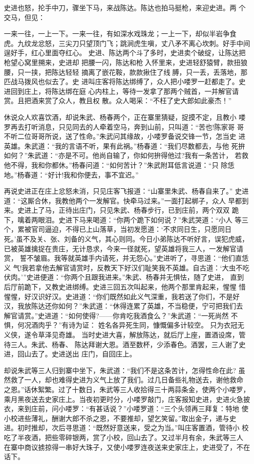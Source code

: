 史进也怒，抡手中刀，骤坐下马，来战陈达。陈达也拍马挺枪，来迎史进。两
个交马，但见：

一来一往，一上一下。一来一往，有如深水戏珠龙；一上一下，却似半岩争食
虎。九纹龙忿怒，三尖刀只望顶门飞；跳涧虎生嗔，丈八矛不离心坎刺。好手中间
逞好手，红心里面夺红心。
史进、陈达两个斗了多时，史进卖个破绽，让陈达把枪望心窝里搠来，史进却
把腰一闪，陈达和枪入怀里来，史进轻舒猿臂，款扭狼腰，只一挟，把陈达轻轻
摘离了嵌花鞍，款款揪住了线膊，只一丢，丢落地，那匹战马拨风也似去了。史
进叫庄客将陈达绑缚了，众人把小喽罗一赶都走了。史进回到庄上，将陈达绑在庭
心内柱上，等待一发拿了那两个贼首，一并解官请赏。且把酒来赏了众人，教且权
散。众人喝采：“不枉了史大郎如此豪杰！”

休说众人欢喜饮酒，却说朱武、杨春两个，正在寨里猜疑，捉摸不定，且教小
喽罗再去打听消息，只见同去的人牵着空马，奔到山前，只叫道：“苦也!陈家哥
哥不听二位哥哥所说，送了性命。”朱武问其缘故，小喽罗备说交锋一节，怎当史
进英雄。朱武道：“我的言语不听，果有此祸。”杨春道：“我们尽数都去，与他
死拚如何？”朱武道：“亦是不可。他尚自输了，你如何拚得他过?我有一条苦计，
若救他不得，我和你都休。”杨春问道：“如何苦计？”朱武附耳低言说道：“只
除恁地。”杨春道：“好计!我和你便去，事不宜迟。”

再说史进正在庄上忿怒未消，只见庄客飞报道：“山寨里朱武、杨春自来了。”
史进道：“这厮合休，我教他两个一发解官。快牵马过来。”一面打起梆子，众人
早都到来。史进上了马，正待出庄门，只见朱武、杨春步行，已到庄前，两个双双
跪下，噙着两眼泪。史进下马来喝道：“你两个跪下如何说？”朱武哭道：“小人
等三个，累被官司逼迫，不得已上山落草，当初发愿道：‘不求同日生，只愿同日
死。’虽不及关、张、刘备的义气，其心则同。今日小弟陈达不听好言，误犯虎威，
已被英雄擒捉在贵庄，无计恳求，今来一径就死，望英雄将我三人，一发解官请赏，
誓不皱眉。我等就英雄手内请死，并无怨心。”史进听了，寻思道：“他们直恁义
气!我若拿他去解官请赏时，反教天下好汉们耻笑我不英雄。自古道：‘大虫不吃
伏肉。’”史进便道：“你两个且跟我进来。”朱武、杨春并无惧怯，随了史进，
直到后厅前跪下，又教史进绑缚。史进三回五次叫起来，他两个那里肯起来，惺惺
惜惺惺，好汉识好汉。史进道：“你们既然如此义气深重，我若送了你们，不是好
汉，我放陈达还你如何？”朱武道：“休得连累了英雄，不当稳便，宁可把我们去
解官请赏。”史进道：“如何使得?——你肯吃我酒食么？”朱武道：“一死尚然
不惧，何况酒肉乎？”有诗为证：
姓名各异死生同，慷慨偏多计较空。
只为衣冠无义侠，遂令草泽见奇雄。
当时史进大喜，解放陈达，就后厅上座，置酒设席，管待三人。朱武、杨春、
陈达拜谢大恩。酒至数杯，少添春色。酒罢，三人谢了史进，回山去了。史进送出
庄门，自回庄上。

却说朱武等三人归到寨中坐下，朱武道：“我们不是这条苦计，怎得性命在此?
虽然救了一人，却也难得史进为义气上放了我们。过几日备些礼物送去，谢他救命
之恩。”话休絮繁。过了十数日，朱武等三人收拾得三十两蒜条金，使两个小喽罗，
乘月黑夜送去史家庄上。当夜初更时分，小喽罗敲门，庄客报知史进，史进火急披
衣，来到庄前，问小喽罗：“有甚话说？”小喽罗道：“三个头领再三拜复：特地
使小校进些薄礼，酬谢大郎不杀之恩，不要推却，望乞笑留。”取出金子，递与史
进。初时推却，次后寻思道：“既然好意送来，受之为当。”叫庄客置酒，管待小
校吃了半夜酒，把些零碎银两，赏了小校，回山去了。又过半月有余，朱武等三人
在寨中商议掳掠得一串好大珠子，又使小喽罗连夜送来史家庄上，史进受了，不在
话下。

